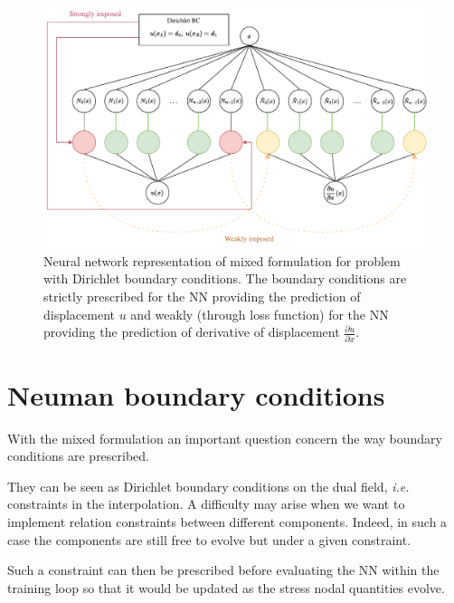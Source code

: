 
\begin{figure}
    \centering
    \includegraphics[trim={0 0 0 0},clip,width = 0.9\linewidth]{Figures/BC_1.drawio.pdf}    
    \caption{Neural network representation of mixed formulation for problem with Dirichlet boundary conditions. The boundary conditions are strictly prescribed for the NN providing the prediction of displacement $u$ and weakly (through loss function) for the NN providing the prediction of derivative of displacement $\frac{\partial u}{\partial x}$.   }
    \label{fig:BCsMixed}
\end{figure}


\section{Neuman boundary conditions}

With the mixed formulation an important question concern the way boundary conditions are prescribed.

They can be seen as Dirichlet boundary conditions on the dual field, \emph{i.e.} constraints in the interpolation. A difficulty may arise when we want to implement relation constraints between different components. Indeed, in such a case the components are still free to evolve but under a given constraint.

Such a constraint can then be prescribed before evaluating the NN within the training loop so that it would be updated as the stress nodal quantities evolve.



